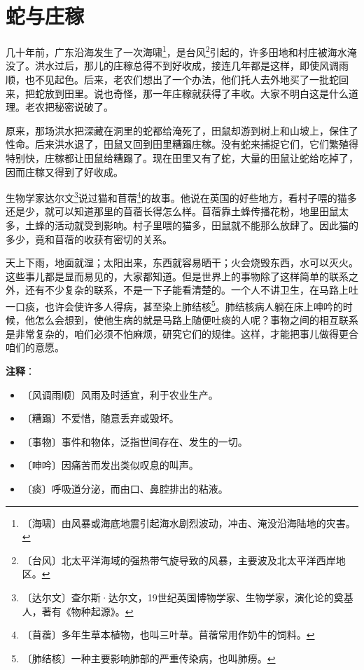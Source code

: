 \documentclass[12pt,UTF-8,openany]{ctexbook}
\begin{document}
\chapter{蛇与庄稼}

\begin{Large}
    
    几十年前，广东沿海发生了一次海啸\footnote{〔海啸〕由风暴或海底地震引起海水剧烈波动，冲击、淹没沿海陆地的灾害。}，是台风\footnote{〔台风〕北太平洋海域的强热带气旋导致的风暴，主要波及北太平洋西岸地区。}引起的，许多田地和村庄被海水淹没了。洪水过后，那儿的庄稼总得不到好收成，接连几年都是这样，即使风调雨顺，也不见起色。后来，老农们想出了一个办法，他们托人去外地买了一批蛇回来，把蛇放到田里。说也奇怪，那一年庄稼就获得了丰收。大家不明白这是什么道理。老农把秘密说破了。
    
    原来，那场洪水把深藏在洞里的蛇都给淹死了，田鼠却游到树上和山坡上，保住了性命。后来洪水退了，田鼠又回到田里糟蹋庄稼。没有蛇来捕捉它们，它们繁殖得特别快，庄稼都让田鼠给糟蹋了。现在田里又有了蛇，大量的田鼠让蛇给吃掉了，因而庄稼又得到了好收成。
    
    生物学家达尔文\footnote{〔达尔文〕查尔斯·达尔文，19世纪英国博物学家、生物学家，演化论的奠基人，著有《物种起源》。}说过猫和苜蓿\footnote{〔苜蓿〕多年生草本植物，也叫三叶草。苜蓿常用作奶牛的饲料。}的故事。他说在英国的好些地方，看村子喂的猫多还是少，就可以知道那里的苜蓿长得怎么样。苜蓿靠土蜂传播花粉，地里田鼠太多，土蜂的活动就受到影响。村子里喂的猫多，田鼠就不能那么放肆了。因此猫的多少，竟和苜蓿的收获有密切的关系。
    
    天上下雨，地面就湿；太阳出来，东西就容易晒干；火会烧毁东西，水可以灭火。这些事儿都是显而易见的，大家都知道。但是世界上的事物除了这样简单的联系之外，还有不少复杂的联系，不是一下子能看清楚的。一个人不讲卫生，在马路上吐一口痰，也许会使许多人得病，甚至染上肺结核\footnote{〔肺结核〕一种主要影响肺部的严重传染病，也叫肺痨。}。肺结核病人躺在床上呻吟的时候，他怎么会想到，使他生病的就是马路上随便吐痰的人呢？事物之间的相互联系是非常复杂的，咱们必须不怕麻烦，研究它们的规律。这样，才能把事儿做得更合咱们的意愿。
    
\end{Large}


\newpage

\textbf{注释}：

\vspace{-1em}

\begin{itemize}
    \setlength\itemsep{-0.2em}
    \item 〔风调雨顺〕风雨及时适宜，利于农业生产。
    \item 〔糟蹋〕不爱惜，随意丢弃或毁坏。
    \item 〔事物〕事件和物体，泛指世间存在、发生的一切。
    \item 〔呻吟〕因痛苦而发出类似叹息的叫声。
    \item 〔痰〕呼吸道分泌，而由口、鼻腔排出的粘液。
\end{itemize}
\end{document}
